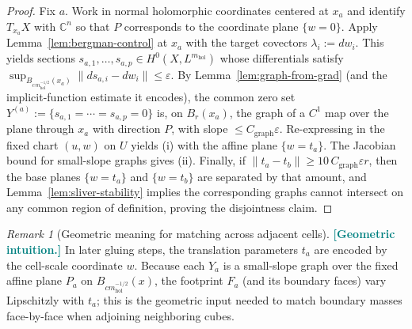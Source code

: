 \documentclass[11pt]{article}
\newcommand{\REVMZ}[1]{\textcolor{teal}{#1}}  %
\numberwithin{equation}{section}  %
\theoremstyle{plain}
\theoremstyle{definition}
\theoremstyle{remark}
\newtheorem{remark}[theorem]{Remark}
\newcommand{\C}{\mathbb{C}}
\newcommand{\mhol}{m_{\mathrm{hol}}} %
\begin{document}
\begin{proof}

Fix $a$.  Work in normal holomorphic coordinates centered at $x_a$ and identify $T_{x_a}X$ with $\C^n$
so that $P$ corresponds to the coordinate plane $\{w=0\}$.
Apply Lemma~\ref{lem:bergman-control} at $x_a$ with the target covectors $\lambda_i:=dw_i$.
This yields sections $s_{a,1},\dots,s_{a,p}\in H^0(X,L^{\mhol})$ whose differentials satisfy
\(
\sup_{B_{c\,\mhol^{-1/2}}(x_a)}\|ds_{a,i}-dw_i\|\le \varepsilon.
\)
By Lemma~\ref{lem:graph-from-grad} (and the implicit-function estimate it encodes), the common zero set
$Y^{(a)}:=\{s_{a,1}=\cdots=s_{a,p}=0\}$ is, on $B_r(x_a)$, the graph of a $C^1$ map over the plane through $x_a$
with direction $P$, with slope $\le C_{\mathrm{graph}}\varepsilon$.  Re-expressing in the fixed chart $(u,w)$ on $U$
yields (i) with the affine plane $\{w=t_a\}$.
The Jacobian bound for small-slope graphs gives (ii).  Finally, if $\|t_a-t_b\|\ge 10\,C_{\mathrm{graph}}\varepsilon r$,
then the base planes $\{w=t_a\}$ and $\{w=t_b\}$ are separated by that amount, and Lemma~\ref{lem:sliver-stability}
implies the corresponding graphs cannot intersect on any common region of definition, proving the disjointness claim.

\end{proof}

\begin{remark}[Geometric meaning for matching across adjacent cells]\label{rem:matching-cells-geometry}
\REVMZ{\textbf{[Geometric intuition.]}}
In later gluing steps, the translation parameters $t_a$ are encoded by the cell-scale coordinate $w$.
Because each $Y_a$ is a small-slope graph over the fixed affine plane $P_a$ on $B_{c\mhol^{-1/2}}(x)$,
the footprint $F_a$ (and its boundary faces) vary Lipschitzly with $t_a$; this is the geometric input needed
to match boundary masses face-by-face when adjoining neighboring cubes.
\end{remark}
\end{document}
